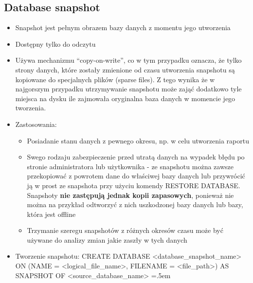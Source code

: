 \documentclass[a4paper]{article}
\newenvironment{lcverbatim}
{\SaveVerbatim{cverb}}
{\endSaveVerbatim
\flushleft\fboxrule=0pt\fboxsep=.5em
\colorbox{cverbbg}{%
\makebox[\dimexpr\linewidth-2\fboxsep][l]{\BUseVerbatim{cverb}}%
}
\endflushleft
}
\begin{document}
    \subsection{Database snapshot}
    \begin{itemize}
        \item Snapshot jest pełnym obrazem bazy danych z momentu jego utworzenia
        \item Dostępny tylko do odczytu
        \item Używa mechanizmu ``copy-on-write'', co w tym przypadku oznacza, że tylko strony danych, które zostały zmienione od czasu utworzenia snapshotu są kopiowane do specjalnych plików (sparse files). Z tego wynika że w najgorszym przypadku utrzymywanie snapshotu może zająć dodatkowo tyle miejsca na dysku ile zajmowała oryginalna baza danych w momencie jego tworzenia.
        \item Zastosowania:
        \begin{itemize}
            \item Posiadanie stanu danych z pewnego okresu, np. w celu utworzenia raportu
            \item Swego rodzaju zabezpieczenie przed utratą danych na wypadek błędu po stronie administratora lub użytkownika - ze snapshotu można zawsze przekopiować z powrotem dane do właściwej bazy danych lub przywrócić ją w prost ze snapshota przy użyciu komendy RESTORE DATABASE. Snapshoty \textbf{nie zastępują jednak kopii zapasowych}, ponieważ nie można na przykład odtworzyć z nich uszkodzonej bazy danych lub bazy, która jest offline
            \item Trzymanie szeregu snapshotów z różnych okresów czasu może być używane do analizy zmian jakie zaszły w tych danych
        \end{itemize}
        \item Tworzenie snapshotu:
        \begin{lcverbatim}
            CREATE DATABASE <database_snapshot_name>
            ON (NAME = <logical_file_name>, FILENAME = <file_path>)
            AS SNAPSHOT OF <source_database_name>
        \end{lcverbatim}
    \end{itemize}
\end{document}
